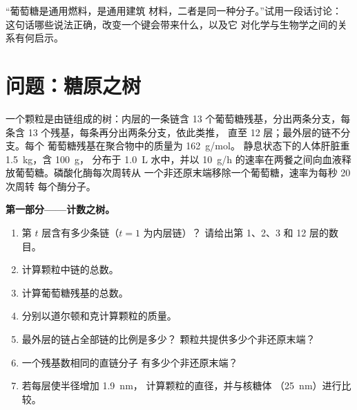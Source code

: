 \begin{exercise}[$\star\star\star$]\label{exo:b1:carbohydrates:12}
“葡萄糖是通用燃料，是通用建筑
材料，二者是同一种分子。”试用一段话讨论：
这句话哪些说法正确，改变一个键会带来什么，以及它
对化学与生物学之间的关系有何启示。
\end{exercise}

\section{问题：糖原之树}

\begin{problem}
\label{pb:b1:carbohydrates:1}
一个颗粒是由链组成的树：内层的一条链含
\qty{13}{} 个葡萄糖残基，分出两条分支，每条含 \qty{13}{}
个残基，每条再分出两条分支，依此类推，
直至 \qty{12}{} 层；最外层的链不分支。每个
葡萄糖残基在聚合物中的质量为 \qty{162}{g/mol}。
静息状态下的人体肝脏重 \qty{1.5}{kg}，含 \qty{100}{g}，
分布于 \qty{1.0}{L} 水中，并以
\qty{10}{g/h} 的速率在两餐之间向血液释放葡萄糖。磷酸化酶每次周转从
一个非还原末端移除一个葡萄糖，速率为每秒 \qty{20}{} 次周转
每个酶分子。

\medskip
\noindent\textbf{第一部分——计数之树。}
\begin{enumerate}
  \item 第 $t$ 层含有多少条链（$t = 1$ 为内层链）？
        请给出第 1、2、3 和 12 层的数目。
  \item 计算颗粒中链的总数。
  \item 计算葡萄糖残基的总数。
  \item 分别以道尔顿和克计算颗粒的质量。
  \item 最外层的链占全部链的比例是多少？
        颗粒共提供多少个非还原末端？
  \item 一个残基数相同的直链分子
        有多少个非还原末端？
  \item 若每层使半径增加 \qty{1.9}{nm}，
        计算颗粒的直径，并与核糖体
        （\qty{25}{nm}）进行比较。
\end{enumerate}


\end{problem}
